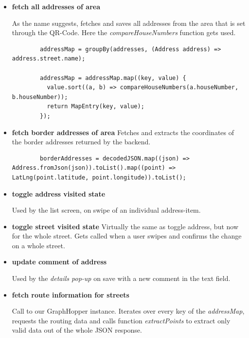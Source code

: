 \begin{itemize}
    \item \textbf{fetch all addresses of area}
    
    As the name suggests, fetches and saves all addresses from the area that is set through the QR-Code. Here the \textit{compareHouseNumbers} function gets used.

    \lstset{style=generic, caption=use of compareHouseNumbers function (AddressProvider.dart)}
    \begin{lstlisting}
        addressMap = groupBy(addresses, (Address address) => address.street.name);

        addressMap = addressMap.map((key, value) {
          value.sort((a, b) => compareHouseNumbers(a.houseNumber, b.houseNumber));
          return MapEntry(key, value);
        });
    \end{lstlisting}

    \item \textbf{fetch border addresses of area}
    Fetches and extracts the coordinates of the border addresses returned by the backend.

    \lstset{style=generic, caption=extraction of coordinates from border addresses (AddressProvider.dart)}
    \begin{lstlisting}
        borderAddresses = decodedJSON.map((json) => Address.fromJson(json)).toList().map((point) => LatLng(point.latitude, point.longitude)).toList();
    \end{lstlisting}

    \item \textbf{toggle address visited state}
    
    Used by the list screen, on swipe of an individual address-item.

    \item \textbf{toggle street visited state}
    Virtually the same as toggle address, but now for the whole street. Gets called when a user swipes and confirms the change on a whole street.

    \item \textbf{update comment of address}
    
    Used by the \textit{details pop-up} on save with a new comment in the text field.

    \item \textbf{fetch route information for streets}
    
    Call to our GraphHopper instance. Iterates over every key of the \textit{addressMap}, requests the routing data and calls function \textit{extractPoints} to extract only valid data out of the whole JSON response.
\end{itemize}

